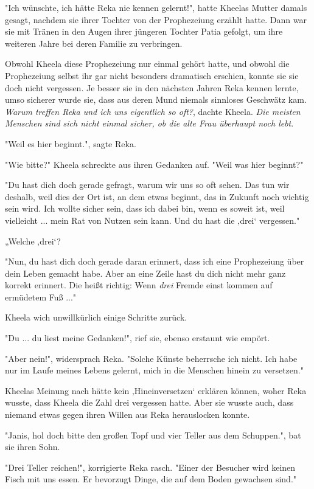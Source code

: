 \documentclass[10pt, a4paper, oneside]{book}
\begin{document}
\begin{multicols}{2}
"Ich wünschte, ich hätte Reka nie kennen gelernt!", hatte Kheelas Mutter damals gesagt, nachdem sie ihrer Tochter von der Prophezeiung erzählt hatte. Dann war sie mit Tränen in den Augen ihrer jüngeren Tochter Patia gefolgt, um ihre weiteren Jahre bei deren Familie zu verbringen. 

Obwohl Kheela diese Prophezeiung nur einmal gehört hatte, und obwohl die Prophezeiung selbst ihr gar nicht besonders dramatisch erschien, konnte sie sie doch nicht vergessen. Je besser sie in den nächsten Jahren Reka kennen lernte, umso sicherer wurde sie, dass aus deren Mund niemals sinnloses Geschwätz kam. \textit{Warum treffen Reka und ich uns eigentlich so oft?}, dachte Kheela. \textit{Die meisten Menschen sind sich nicht einmal sicher, ob die alte Frau überhaupt noch lebt}. 

"Weil es hier beginnt.", sagte Reka.

"Wie bitte?" Kheela schreckte aus ihren Gedanken auf. "Weil was hier beginnt?" 

"Du hast dich doch gerade gefragt, warum wir uns so oft sehen. Das tun wir deshalb, weil dies der Ort ist, an dem etwas beginnt, das in Zukunft noch wichtig sein wird. Ich wollte sicher sein, dass ich dabei bin, wenn es soweit ist, weil vielleicht ... mein Rat von Nutzen sein kann. Und du hast die ‚drei‘ vergessen." 

„Welche ‚drei‘?

"Nun, du hast dich doch gerade daran erinnert, dass ich eine Prophezeiung über dein Leben gemacht habe. Aber an eine Zeile hast du dich nicht mehr ganz korrekt erinnert. Die heißt richtig: Wenn \textit{drei} Fremde einst kommen auf ermüdetem Fuß ..." 

Kheela wich unwillkürlich einige Schritte zurück.

"Du ... du liest meine Gedanken!", rief sie, ebenso erstaunt wie empört. 

"Aber nein!", widersprach Reka. "Solche Künste beherrsche ich nicht. Ich habe nur im Laufe meines Lebens gelernt, mich in die Menschen hinein zu versetzen."

Kheelas Meinung nach hätte kein ‚Hineinversetzen‘ erklären können, woher Reka wusste, dass Kheela die Zahl drei vergessen hatte. Aber sie wusste auch, dass niemand etwas gegen ihren Willen aus Reka herauslocken konnte. 

"Janis, hol doch bitte den großen Topf und vier Teller aus dem Schuppen.", bat sie ihren Sohn. 

"Drei Teller reichen!", korrigierte Reka rasch. "Einer der Besucher wird keinen Fisch mit uns essen. Er bevorzugt Dinge, die auf dem Boden gewachsen sind." 


\end{multicols}
\end{document}
